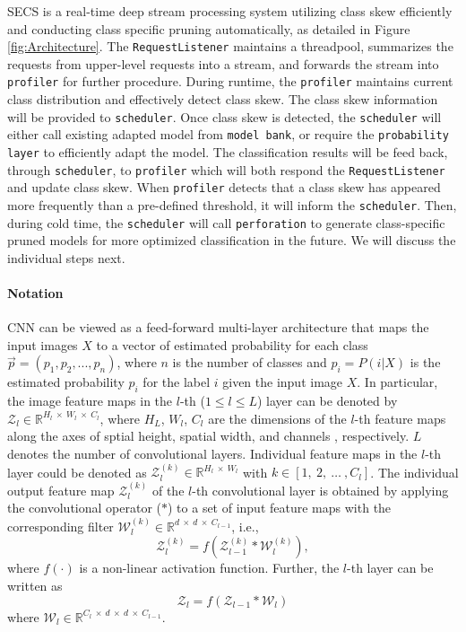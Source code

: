 \documentclass[pageno]{jpaper}
\begin{document}
SECS is a real-time deep stream processing system utilizing class skew efficiently and conducting class specific pruning automatically, as detailed in Figure \ref{fig:Architecture}. The \texttt{RequestListener} maintains a threadpool, summarizes the requests from upper-level requests into a stream, and forwards the stream into \texttt{profiler} for further procedure. During runtime, the \texttt{profiler} maintains current class distribution and effectively detect class skew. The class skew information will be provided to \texttt{scheduler}. Once class skew is detected, the \texttt{scheduler} will either call existing adapted model from \texttt{model bank}, or require the \texttt{probability layer} to efficiently adapt the model. The classification results will be feed back, through \texttt{scheduler}, to \texttt{profiler} which will both respond the \texttt{RequestListener} and update class skew. When \texttt{profiler} detects that a class skew has appeared more frequently than a pre-defined threshold, it will inform the \texttt{scheduler}. Then, during cold time, the \texttt{scheduler} will call \texttt{perforation} to generate class-specific pruned models for more optimized classification in the future. We will discuss the individual steps next.






\paragraph{Notation}
CNN can be viewed as a feed-forward multi-layer architecture that maps the input images $X$ to a vector of estimated probability for each class $\vec{p} = (p_1, p_2, ..., p_n)$, where $n$ is the number of classes and $p_i = P(i|X)$ is the estimated probability $p_i$ for the label $i$ given the input image $X$. In particular, the image feature maps in the $l$-th ($1 \leqslant l \leqslant L$) layer can be denoted by $\mathcal{Z}_l \in \mathbb{R}^{H_l \: \times \: W_l \: \times \: C_l}$, where $H_L$, $W_l$, $C_l$ are the dimensions of the $l$-th feature maps along the axes of sptial height, spatial width, and channels , respectively. $L$ denotes the number of convolutional layers. Individual feature maps in the $l$-th layer could be denoted as $\mathcal{Z}_l^{(k)} \in \mathbb{R}^{H_l \: \times \: W_l}$ with $k \in [1, \:2, \: \dots \:, C_l]$. The individual output feature map $\mathcal{Z}_l^{(k)}$ of the $l$-th convolutional layer is obtained by applying the convolutional operator ($\ast$) to a set of input feature maps with the corresponding filter $\mathcal{W}_l^{(k)} \in \mathbb{R}^{d \: \times \: d \: \times \: C_{l-1}}$, i.e.,
\begin{equation}
    \mathcal{Z}_l^{(k)} = f(\mathcal{Z}_{l-1}^{(k)} \ast \mathcal{W}_l^{(k)}),
\end{equation}
where $f(\cdot)$ is a non-linear activation function. Further, the $l$-th layer can be written as
\begin{equation} \label{eq:1}
    \mathcal{Z}_l = f(\mathcal{Z}_{l-1} \ast \mathcal{W}_l)
\end{equation}
where $\mathcal{W}_l \in \mathbb{R}^{C_l \: \times \:   d \: \times \: d \: \times \: C_{l-1}}$.
\end{document}
